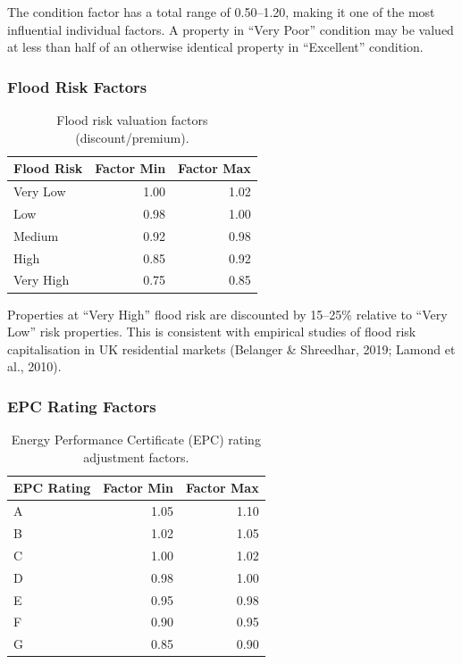 \documentclass[11pt,a4paper]{article}
\begin{document}
\noindent The condition factor has a total range of 0.50--1.20, making it
one of the most influential individual factors. A property in ``Very Poor''
condition may be valued at less than half of an otherwise identical property
in ``Excellent'' condition.

\subsubsection{Flood Risk Factors}

\begin{table}[H]
\centering
\caption{Flood risk valuation factors (discount/premium).}
\label{tab:flood_risk_factors}
\begin{tabular}{lrr}
\toprule
\textbf{Flood Risk} & \textbf{Factor Min} & \textbf{Factor Max} \\
\midrule
Very Low  & 1.00 & 1.02 \\
Low       & 0.98 & 1.00 \\
Medium    & 0.92 & 0.98 \\
High      & 0.85 & 0.92 \\
Very High & 0.75 & 0.85 \\
\bottomrule
\end{tabular}
\end{table}

\noindent Properties at ``Very High'' flood risk are discounted by
15--25\% relative to ``Very Low'' risk properties. This is consistent
with empirical studies of flood risk capitalisation in UK residential
markets (Belanger \& Shreedhar, 2019; Lamond et al., 2010).

\subsubsection{EPC Rating Factors}

\begin{table}[H]
\centering
\caption{Energy Performance Certificate (EPC) rating adjustment factors.}
\label{tab:epc_factors}
\begin{tabular}{lrr}
\toprule
\textbf{EPC Rating} & \textbf{Factor Min} & \textbf{Factor Max} \\
\midrule
A & 1.05 & 1.10 \\
B & 1.02 & 1.05 \\
C & 1.00 & 1.02 \\
D & 0.98 & 1.00 \\
E & 0.95 & 0.98 \\
F & 0.90 & 0.95 \\
G & 0.85 & 0.90 \\
\bottomrule
\end{tabular}
\end{table}
\end{document}
